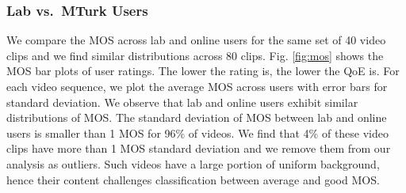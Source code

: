 \subsubsection{Lab  vs.~MTurk Users}
We compare the MOS across lab and online users for the same set of 40 video clips and we find similar distributions across 80 clips. Fig. \ref{fig:mos} shows the MOS bar plots of user ratings. The lower the rating is, the lower the QoE is. For each video sequence, we plot the average MOS across users with error bars for standard deviation. We observe that lab and online users exhibit similar distributions of MOS. The standard deviation of MOS between lab and online users is smaller than 1 MOS for 96\% of videos. 
We find that 4\% of these video clips have more than 1 MOS standard deviation and we remove them from our analysis as outliers. Such videos have a  large portion of uniform background, hence their content challenges classification between average and good MOS.

